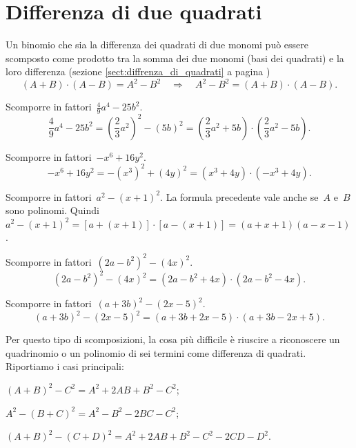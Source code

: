 \section{Differenza di due quadrati}
Un binomio che sia la differenza dei quadrati di due monomi può essere scomposto come prodotto tra la somma dei due monomi
(basi dei quadrati) e la loro differenza (sezione \ref{sect:diffrenza_di_quadrati} a pagina \pageref{sect:diffrenza_di_quadrati})
\begin{equation*}
(A+B)\cdot (A-B)=A^{2}-B^{2}\quad \Rightarrow \quad A^{2}-B^{2}=(A+B)\cdot (A-B).
\end{equation*}

\begin{exrig}
 \begin{esempio}
Scomporre in fattori~$\frac{4}{9}a^{4}-25b^{2}$.
\[\frac{4}{9}a^{4}-25b^{2}=\left(\frac{2}{3}a^{2}\right)^{2}-\left(5b\right)^{2}=\left(\frac{2}{3}a^{2}+5b\right)
\cdot \left(\frac{2}{3}a^{{2}}-5b\right).\]
 \end{esempio}

 \begin{esempio}
Scomporre in fattori~$-x^{6}+16y^{2}$.
\[-x^{6}+16y^{2}=-\left(x^{3}\right)^{2}+\left(4y\right)^{2}=\left(x^{3}+4y\right)\cdot \left(-x^{3}+4y\right).\]
 \end{esempio}

 \begin{esempio}
Scomporre in fattori~$a^{2}-\left(x+1\right)^{2}$.
La formula precedente vale anche se~$A$ e~$B$ sono polinomi. Quindi $a^{2}-\left(x+1\right)^{2}=\left[a+(x+1)\right]\cdot \left[a-(x+1)\right]=(a+x+1)(a-x-1)$.
\end{esempio}

 \begin{esempio}
Scomporre in fattori~$\left(2a-b^{2}\right)^{2}-(4x)^{2}$.
\[\left(2a-b^{2}\right)^{2}-(4x)^{2}=\left(2a-b^{2}+4x\right)\cdot \left(2a-b^{2}-4x\right).\]
 \end{esempio}

 \begin{esempio}
Scomporre in fattori~$(a+3b)^{2}-(2x-5)^{2}$.
\[(a+3b)^{2}-(2x-5)^{2}=(a+3b+2x-5)\cdot (a+3b-2x+5).\]
 \end{esempio}
\end{exrig}

Per questo tipo di scomposizioni, la cosa più difficile è riuscire a riconoscere un quadrinomio o un polinomio
di sei termini come differenza di quadrati. Riportiamo i casi principali:
\begin{itemize*}
 \item $(A+B)^{2}-C^{2}=A^{{2}}+2AB+B^{2}-C^{2}$;
 \item $A^{2}-(B+C)^{2}=A^{2}-B^{2}-2BC-C^{2}$;
 \item $(A+B)^{2}-(C+D)^{2}=A^{2}+2AB+B^{2}-C^{2}-2CD-D^{2}$.
\end{itemize*}

